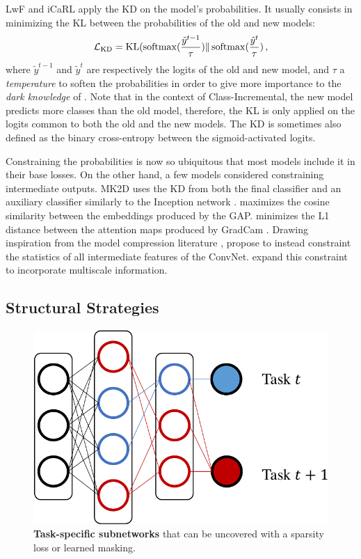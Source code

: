LwF \cite{li2018lwf} and iCaRL apply the \ac{KD} \cite{hinton2015knowledge_distillation} on the
model's probabilities. It usually consists in minimizing the \ac{KL} between the probabilities
of the old and new models:
%
\begin{equation}
      \mathcal{L}_\text{KD} = \operatorname{KL}(\operatorname{softmax}(\frac{\tilde{y}^{t-1}}{\tau}) \Vert \operatorname{softmax}(\frac{\tilde{y}^t}{\tau})\,,
\end{equation}
%
where $\tilde{y}^{t-1}$ and $\tilde{y}^{t}$ are respectively the logits of the old and new model,
and $\tau$ a \textit{temperature} to soften the probabilities in order to give more importance to
the \textit{dark knowledge} of \cite{hinton2015knowledge_distillation}. Note that in the context of
Class-Incremental, the new model predicts more classes than the old model, therefore, the \ac{KL} is
only applied on the logits common to both the old and the new models. The \ac{KD} is sometimes also
defined as the binary cross-entropy between the sigmoid-activated logits.

Constraining the probabilities is now so ubiquitous that most models include it in their base
losses. On the other hand, a few models considered constraining intermediate outputs. MK2D
\citep{peng2019m2kd} uses the \ac{KD} from both the final classifier and an auxiliary classifier
similarly to the Inception network \citep{szegedy2015inception}. \cite{hou2019ucir} maximizes the
cosine similarity between the embeddings produced by the \ac{GAP}.
\cite{dhar2019learning_without_memorizing_gradcam} minimizes the L1 distance between the attention
maps produced by GradCam \citep{selvaraju2017gradcam}. Drawing inspiration from the model
compression literature \cite{zagoruyko2016distillation_attention}, \cite{douillard2020podnet}
propose to instead constraint the statistics of all intermediate features of the \ac{ConvNet}.
\cite{douillard2020plop} expand this constraint to incorporate multiscale information.

\subsection{Structural Strategies}
\label{sec:related_structural}

\begin{figure}[tb]
      \begin{center}
            \includegraphics[width=0.6\linewidth]{images/related/subnetworks.pdf}
      \end{center}
      \caption{\textbf{Task-specific subnetworks} that can be uncovered with a sparsity loss or
            learned masking.}
      \label{fig:related_subnetwork}
\end{figure}

